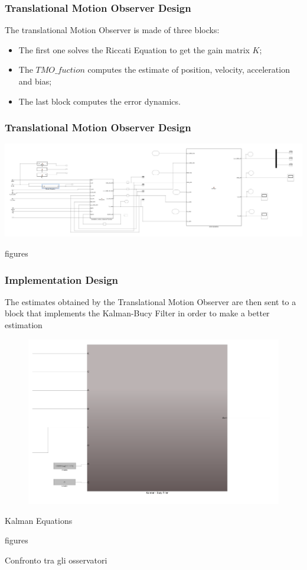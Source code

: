 \documentclass{beamer}
\begin{document}
	\begin{frame}
		\frametitle{Translational Motion Observer Design}
		The translational Motion Observer is made of three blocks:\\
		
		\begin{itemize}
			\item The first one solves the Riccati Equation to get the gain matrix $K$;
			
			\item The $TMO\_fuction$ computes the estimate of position, velocity, acceleration and bias;
			
			\item The last block computes the error dynamics.
		\end{itemize}
	\end{frame}
	
	\begin{frame}
		\frametitle{Translational Motion Observer Design}
		\includegraphics[scale = 0.25]{TMO}
	\end{frame}
	
	\begin{frame}
		figures
	\end{frame}
	
	\begin{frame}
		\frametitle{Implementation Design}
		The estimates obtained by the Translational Motion Observer are then sent to a block that implements the Kalman-Bucy Filter in order to make a better estimation
		
		\begin{figure}[H]
			\includegraphics[scale=0.3]{KBF}
		\end{figure}
		
	\end{frame}
	
	\begin{frame}
		Kalman Equations
	\end{frame}
	
	\begin{frame}
			figures
	\end{frame}
	
	\begin{frame}
			Confronto tra gli osservatori
	\end{frame}
\end{document}
